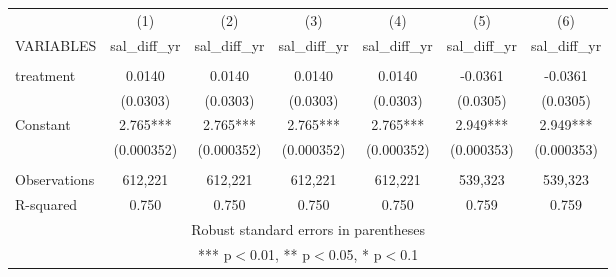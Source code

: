 \documentclass[]{article}
\begin{document}
\begin{tabular}{lcccccc} \hline
 & (1) & (2) & (3) & (4) & (5) & (6) \\
VARIABLES & sal\_diff\_yr & sal\_diff\_yr & sal\_diff\_yr & sal\_diff\_yr & sal\_diff\_yr & sal\_diff\_yr \\ \hline
 &  &  &  &  &  &  \\
treatment & 0.0140 & 0.0140 & 0.0140 & 0.0140 & -0.0361 & -0.0361 \\
 & (0.0303) & (0.0303) & (0.0303) & (0.0303) & (0.0305) & (0.0305) \\
Constant & 2.765*** & 2.765*** & 2.765*** & 2.765*** & 2.949*** & 2.949*** \\
 & (0.000352) & (0.000352) & (0.000352) & (0.000352) & (0.000353) & (0.000353) \\
 &  &  &  &  &  &  \\
Observations & 612,221 & 612,221 & 612,221 & 612,221 & 539,323 & 539,323 \\
 R-squared & 0.750 & 0.750 & 0.750 & 0.750 & 0.759 & 0.759 \\ \hline
\multicolumn{7}{c}{ Robust standard errors in parentheses} \\
\multicolumn{7}{c}{ *** p$<$0.01, ** p$<$0.05, * p$<$0.1} \\
\end{tabular}
\end{document}
